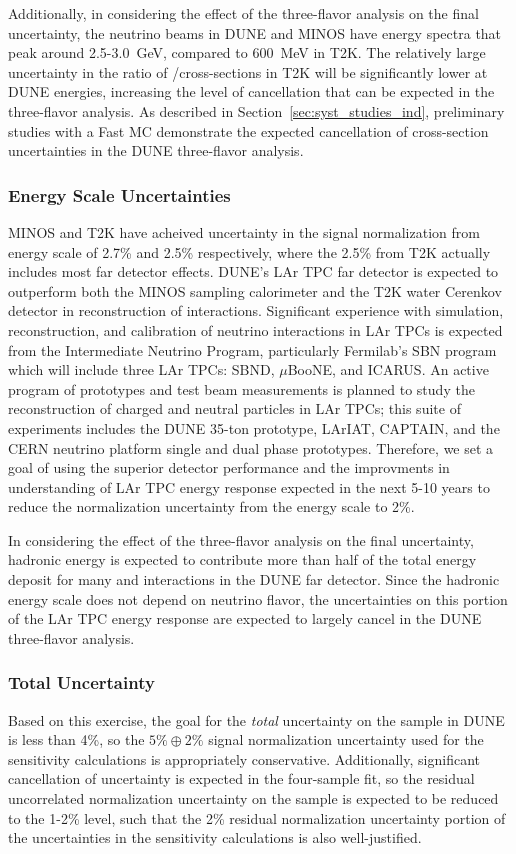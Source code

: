 Additionally, in considering the effect of the three-flavor analysis on the final uncertainty,
the neutrino beams in DUNE and MINOS have energy
spectra that peak around 2.5-3.0~GeV, compared to 600~MeV in T2K. The relatively large uncertainty
in the ratio of \nue/\numu cross-sections in T2K will be significantly lower at DUNE energies,
increasing the level of cancellation that can be expected in the three-flavor analysis. As
described in Section~\ref{sec:syst_studies_ind}, preliminary studies with a Fast MC demonstrate the
expected cancellation of cross-section uncertainties in the DUNE three-flavor analysis.

\subsubsection{\nue Energy Scale Uncertainties}
\label{sec:syst_just_fd}
MINOS and T2K have acheived uncertainty in the \nue signal normalization from \nue energy scale
of 2.7\% and 2.5\% respectively,
where the 2.5\% from T2K actually includes most far detector effects. DUNE's LAr TPC far detector
is expected to outperform both the MINOS sampling calorimeter and the T2K water Cerenkov detector
in reconstruction of \nue interactions. Significant experience with simulation, reconstruction, and calibration
of neutrino interactions in LAr TPCs is expected from the Intermediate Neutrino Program, particularly
Fermilab's SBN program which will include three LAr TPCs: SBND, $\mu$BooNE, and ICARUS. An active program of
prototypes and test beam measurements is planned to study the reconstruction of charged and neutral particles
in LAr TPCs; this suite of experiments includes the DUNE 35-ton prototype, LArIAT, CAPTAIN, and
the CERN neutrino platform single and dual phase prototypes.
Therefore, we set a goal of using the superior detector performance and the improvments
in understanding of LAr TPC energy response expected in the next 5-10 years to reduce the normalization uncertainty
from the \nue energy scale to 2\%.

In considering the effect of the three-flavor analysis on the final uncertainty, hadronic energy is expected
to contribute more than half of the total energy deposit for many \nue and \numu interactions in the DUNE
far detector. Since the hadronic energy scale does not depend on neutrino flavor, the uncertainties on this
portion of the LAr TPC energy response are expected to largely cancel in the DUNE three-flavor analysis.

\subsubsection{Total Uncertainty}
Based on this exercise, the goal for the \emph{total} uncertainty on the \nue sample in
DUNE is less than 4\%, so the $5\% \oplus 2\%$ \nue signal normalization uncertainty
used for the sensitivity calculations is appropriately conservative.
Additionally, significant cancellation of uncertainty is expected in the four-sample fit, so the
residual uncorrelated normalization uncertainty on the \nue sample is expected to be reduced to the 1-2\% level,
such that the 2\% residual normalization uncertainty portion of the uncertainties in the sensitivity calculations
is also well-justified.

